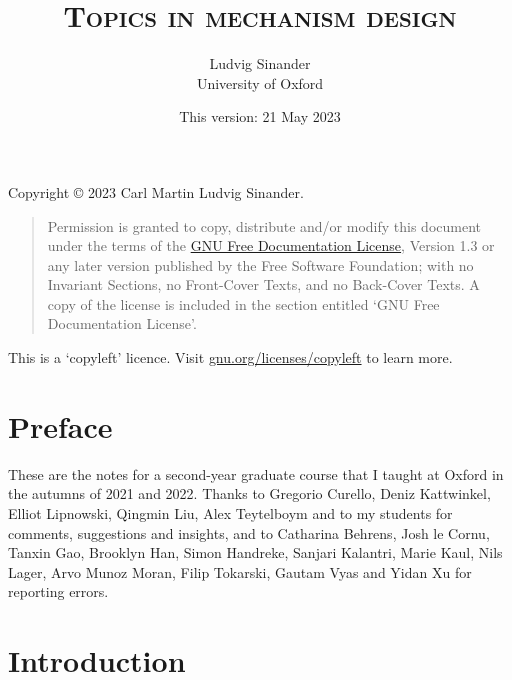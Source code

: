 \documentclass[11pt,letterpaper,reqno,oneside]{book}
\title{\scshape Topics in mechanism design}
\author{Ludvig Sinander \\
University of Oxford}
\date{\small This version: 21 May 2023}
\begin{document}
\maketitle

\pagebreak
\hspace{1pt}\vfill
\noindent
Copyright \copyright{} 2023 Carl Martin Ludvig Sinander.

\begin{quotation}
\noindent
Permission is granted to copy, distribute and/or modify this document under the terms of the \href{https://www.gnu.org/licenses/fdl}{GNU Free Documentation License}, Version 1.3 or any later version published by the Free Software Foundation; with no Invariant Sections, no Front-Cover Texts, and no Back-Cover Texts. A copy of the license is included in the section entitled `GNU
Free Documentation License'.
\end{quotation}

\noindent
This is a `copyleft' licence.
Visit \href{https://www.gnu.org/licenses/copyleft}{gnu.org/licenses/copyleft} to learn more.



\chapter*{Preface}
\label{preface}

These are the notes for a second-year graduate course that I taught at Oxford in the autumns of 2021 and 2022.
Thanks to Gregorio Curello, Deniz Kattwinkel, Elliot Lipnowski, Qingmin Liu, Alex Teytelboym and to my students for comments, suggestions and insights,
and to Catharina Behrens, Josh le Cornu, Tanxin Gao, Brooklyn Han, Simon Handreke, Sanjari Kalantri, Marie Kaul, Nils Lager, Arvo Munoz Moran, Filip Tokarski, Gautam Vyas and Yidan Xu for reporting errors.



\pagebreak
{}
\setcounter{tocdepth}{1}
\tableofcontents
{}



\setcounter{chapter}{-1}
\chapter{Introduction}
\label{ch0}
\end{document}

